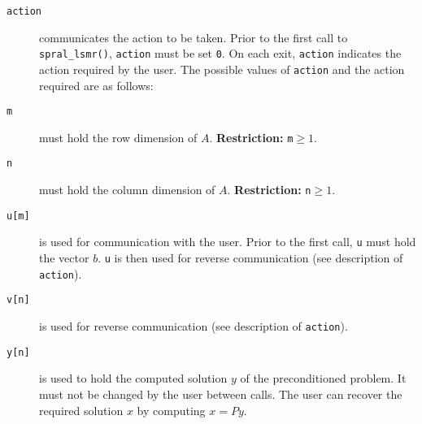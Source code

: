 \noindent
\begin{description}

\item[\texttt{action}] communicates the action to be taken.
Prior to the first call to {\tt spral\_lsmr()},
{\tt action} must be set {\tt 0}. On each exit, {\tt action}
indicates the action required by the user. The possible values of {\tt action}
and the action required are as follows:

\item[\texttt{m}] must hold 
the row dimension of $A$. {\bf Restriction:} {\tt m}$ \ge 1$.

\item[\texttt{n}] must hold 
the column dimension of $A$.  {\bf Restriction:} {\tt n}$ \ge 1$.

\item[\texttt{u[m]}] is used for communication with the user. Prior to the first call, {\tt u} must hold the vector $b$.
{\tt u} is then used for reverse communication (see description of \texttt{action}).

\item[\texttt{v[n]}] is used for reverse communication (see description of \texttt{action}).


\item[\texttt{y[n]}] is used to hold the computed solution $y$ of the
preconditioned problem. It must not be changed by the user between calls.
The user can recover the required solution $x$ by computing $x = Py$.


\end{description}
